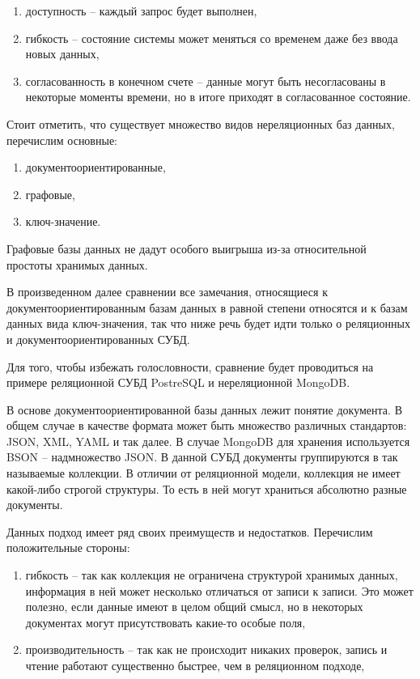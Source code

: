 \begin{enumerate}
    \item доступность -- каждый запрос будет выполнен,
    \item гибкость -- состояние системы может меняться со временем даже без ввода новых данных,
    \item согласованность в конечном счете -- данные могут быть несогласованы в некоторые
        моменты времени, но в итоге приходят в согласованное состояние.
\end{enumerate}

Стоит отметить, что существует множество видов нереляционных баз данных, перечислим
основные:

\begin{enumerate}
    \item документоориентированные,
    \item графовые,
    \item ключ-значение.
\end{enumerate}

Графовые базы данных не дадут особого выигрыша из-за относительной простоты хранимых данных.

В произведенном далее сравнении все замечания, относящиеся к документоориентированным базам данных
в равной степени относятся и к базам данных вида ключ-значения, так что ниже речь будет идти
только о реляционных и документоориентированных СУБД.

Для того, чтобы избежать голословности, сравнение будет проводиться на примере реляционной СУБД PostreSQL и 
нереляционной MongoDB.

В основе документоориентированной базы данных лежит понятие документа. В общем случае в качестве формата
может быть множество различных стандартов: JSON, XML, YAML и так далее. В случае MongoDB для хранения
используется BSON -- надмножество JSON. В данной СУБД документы группируются в так называемые
коллекции. В отличии от реляционной модели, коллекция не имеет какой-либо строгой структуры. То есть
в ней могут храниться абсолютно разные документы.

Данных подход имеет ряд своих преимуществ и недостатков. Перечислим положительные стороны:

\begin{enumerate}
    \item гибкость -- так как коллекция не ограничена структурой хранимых данных, информация
        в ней может несколько отличаться от записи к записи. Это может полезно, если
        данные имеют в целом общий смысл, но в некоторых документах могут присутствовать
        какие-то особые поля,
    \item производительность -- так как не происходит никаких проверок, запись и чтение
        работают существенно быстрее, чем в реляционном подходе,
\end{enumerate}


